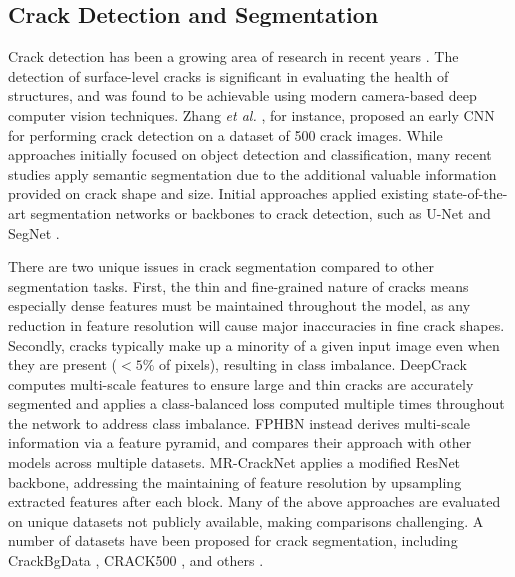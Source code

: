 \documentclass[a4paper,12pt]{report}
\begin{document}
\subsection{Crack Detection and Segmentation}
Crack detection has been a growing area of research in recent years \cite{hamishebahar_comprehensive_2022}.
The detection of surface-level cracks is significant in evaluating the health of structures, and was found to be achievable using modern camera-based deep computer vision techniques.
Zhang \textit{et al.} \cite{zhang_road_2016}, for instance, proposed an early CNN for performing crack detection on a dataset of 500 crack images. While approaches initially focused on object detection and classification, many recent studies apply semantic segmentation \cite{hamishebahar_comprehensive_2022} due to the additional valuable information provided on crack shape and size. Initial approaches applied existing state-of-the-art segmentation networks or backbones to crack detection, such as U-Net \cite{david_jenkins_deep_2018} and SegNet \cite{chen_pavement_2020}.

There are two unique issues in crack segmentation compared to other segmentation tasks. First, the thin and fine-grained nature of cracks means especially dense features must be maintained throughout the model, as any reduction in feature resolution will cause major inaccuracies in fine crack shapes. Secondly, cracks typically make up a minority of a given input image even when they are present ($<5\%$ of pixels), resulting in class imbalance. DeepCrack \cite{liu_deepcrack_2019} computes multi-scale features to ensure large and thin cracks are accurately segmented and applies a class-balanced loss computed multiple times throughout the network to address class imbalance. FPHBN \cite{yang_feature_2019} instead derives multi-scale information via a feature pyramid, and compares their approach with other models across multiple datasets. MR-CrackNet \cite{nayyeri_multi-resolution_2021} applies a modified ResNet \cite{he_deep_2015} backbone, addressing the maintaining of feature resolution by upsampling extracted features after each block.
Many of the above approaches are evaluated on unique datasets not publicly available, making comparisons challenging. A number of datasets have been proposed for crack segmentation, including CrackBgData \cite{nayyeri_multi-resolution_2021}, CRACK500 \cite{yang_feature_2019}, and others \cite{eisenbach_how_2017} \cite{shi_automatic_2016} \cite{amhaz_automatic_2016} \cite{zou_cracktree_2012}.
\end{document}
